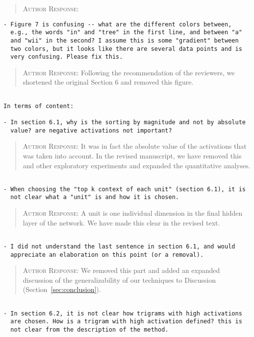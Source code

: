 \begin{quote}
\textsc{Author Response:}  
\end{quote}
\begin{verbatim}
- Figure 7 is confusing -- what are the different colors between,
  e.g., the words "in" and "tree" in the first line, and between "a"
  and "wii" in the second? I assume this is some "gradient" between
  two colors, but it looks like there are several data points and is
  very confusing. Please fix this.
\end{verbatim}  
\begin{quote}
\textsc{Author Response:}  Following the recommendation of the reviewers,
we shortened the original Section 6 and removed this figure.
\end{quote}
\begin{verbatim}

In terms of content:

- In section 6.1, why is the sorting by magnitude and not by absolute
  value? are negative activations not important?
\end{verbatim}  
\begin{quote}
\textsc{Author Response:}  It was in fact the absolute value of the activations 
that was taken into account. In the revised manuscript, we have removed this 
and other exploratory experiments and expanded the quantitative analyses.
\end{quote}
\begin{verbatim}

- When choosing the "top k context of each unit" (section 6.1), it is
  not clear what a "unit" is and how it is chosen.
\end{verbatim}  
\begin{quote}
\textsc{Author Response:}  A unit is one individual dimension in the final hidden layer 
of the network. We have made this clear in the revised text.
\end{quote}
\begin{verbatim}

- I did not understand the last sentence in section 6.1, and would
  appreciate an elaboration on this point (or a removal).
\end{verbatim}  
\begin{quote}
\textsc{Author Response:}  We removed this part and added an expanded discussion of the generalizability of our techniques to Discussion (Section~\ref{sec:conclusion}).
\end{quote}
\begin{verbatim}

- In section 6.2, it is not clear how trigrams with high activations
  are chosen. How is a trigram with high activation defined? this is
  not clear from the description of the method.
\end{verbatim}  
